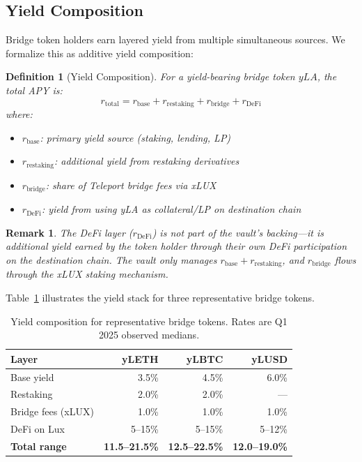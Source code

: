 \documentclass[11pt,twocolumn]{article}
\newtheorem{definition}{Definition}[section]
\newtheorem{remark}{Remark}[section]
\begin{document}
\subsection{Yield Composition}\label{sec:composition}

Bridge token holders earn layered yield from multiple simultaneous sources. We formalize this as additive yield composition:

\begin{definition}[Yield Composition]
For a yield-bearing bridge token $yLA$, the total APY is:
\begin{equation}\label{eq:yield_composition}
  r_{\text{total}} = r_{\text{base}} + r_{\text{restaking}} + r_{\text{bridge}} + r_{\text{DeFi}}
\end{equation}
where:
\begin{itemize}[nosep]
  \item $r_{\text{base}}$: primary yield source (staking, lending, LP)
  \item $r_{\text{restaking}}$: additional yield from restaking derivatives
  \item $r_{\text{bridge}}$: share of Teleport bridge fees via xLUX
  \item $r_{\text{DeFi}}$: yield from using yLA as collateral/LP on destination chain
\end{itemize}
\end{definition}

\begin{remark}
The DeFi layer ($r_{\text{DeFi}}$) is not part of the vault's backing---it is additional yield earned by the token holder through their own DeFi participation on the destination chain. The vault only manages $r_{\text{base}} + r_{\text{restaking}}$, and $r_{\text{bridge}}$ flows through the xLUX staking mechanism.
\end{remark}

Table~\ref{tab:yield_composition} illustrates the yield stack for three representative bridge tokens.

\begin{table}[h]
\centering
\small
\caption{Yield composition for representative bridge tokens. Rates are Q1 2025 observed medians.}
\label{tab:yield_composition}
\begin{tabular}{@{}lrrr@{}}
\toprule
\textbf{Layer} & \textbf{yLETH} & \textbf{yLBTC} & \textbf{yLUSD} \\
\midrule
Base yield & 3.5\% & 4.5\% & 6.0\% \\
Restaking & 2.0\% & 2.0\% & --- \\
Bridge fees (xLUX) & 1.0\% & 1.0\% & 1.0\% \\
DeFi on Lux & 5--15\% & 5--15\% & 5--12\% \\
\midrule
\textbf{Total range} & \textbf{11.5--21.5\%} & \textbf{12.5--22.5\%} & \textbf{12.0--19.0\%} \\
\bottomrule
\end{tabular}
\end{table}
\end{document}
